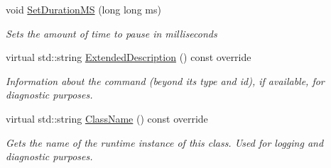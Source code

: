 \begin{DoxyCompactItemize}
void \mbox{\hyperlink{class_command_lib_1_1_pause_command_a87681b8e122468292369874bad63bc8e}{Set\+Duration\+MS}} (long long ms)
\begin{DoxyCompactList}\small\item\em Sets the amount of time to pause in milliseconds \end{DoxyCompactList}\item 
\mbox{\label{class_command_lib_1_1_pause_command_a211772cefb139755c74495f190a9a607}} 
virtual std\+::string \mbox{\hyperlink{class_command_lib_1_1_pause_command_a211772cefb139755c74495f190a9a607}{Extended\+Description}} () const override
\begin{DoxyCompactList}\small\item\em Information about the command (beyond its type and id), if available, for diagnostic purposes.  \end{DoxyCompactList}\item 
\mbox{\label{class_command_lib_1_1_pause_command_afcdddf1fa8b52a3bfec665b1db736cc5}} 
virtual std\+::string \mbox{\hyperlink{class_command_lib_1_1_pause_command_afcdddf1fa8b52a3bfec665b1db736cc5}{Class\+Name}} () const override
\begin{DoxyCompactList}\small\item\em Gets the name of the runtime instance of this class. Used for logging and diagnostic purposes.  \end{DoxyCompactList}\end{DoxyCompactItemize}
